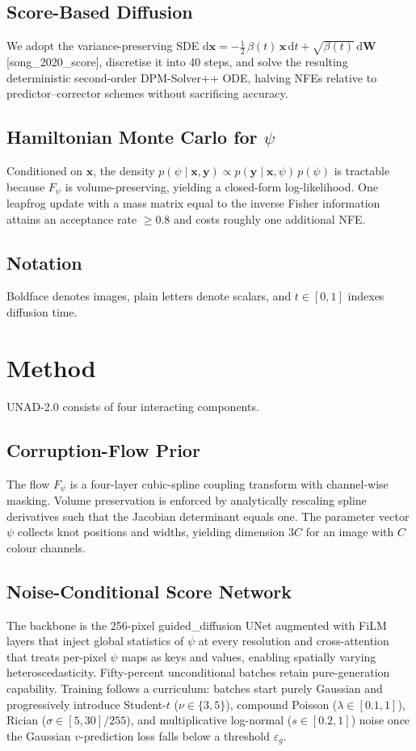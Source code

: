\documentclass{article} %
\begin{document}
\subsection{Score-Based Diffusion}
We adopt the variance-preserving SDE \(\mathrm{d}\mathbf{x}=-\tfrac{1}{2}\,\beta(t)\,\mathbf{x}\,\mathrm{d}t+\sqrt{\beta(t)}\,\mathrm{d}\mathbf{W}\) [song_2020_score], discretise it into 40 steps, and solve the resulting deterministic second-order DPM-Solver++ ODE, halving NFEs relative to predictor–corrector schemes without sacrificing accuracy.

\subsection{Hamiltonian Monte Carlo for \(\psi\)}
Conditioned on \(\mathbf{x}\), the density \(p(\psi\mid\mathbf{x},\mathbf{y})\propto p(\mathbf{y}\mid\mathbf{x},\psi)\,p(\psi)\) is tractable because \(F_{\psi}\) is volume-preserving, yielding a closed-form log-likelihood. One leapfrog update with a mass matrix equal to the inverse Fisher information attains an acceptance rate \(\geq 0.8\) and costs roughly one additional NFE.

\subsection{Notation}
Boldface denotes images, plain letters denote scalars, and \(t\in[0,1]\) indexes diffusion time.

\section{Method}
\label{sec:method}
UNAD-2.0 consists of four interacting components.

\subsection{Corruption-Flow Prior}
The flow \(F_{\psi}\) is a four-layer cubic-spline coupling transform with channel-wise masking. Volume preservation is enforced by analytically rescaling spline derivatives such that the Jacobian determinant equals one. The parameter vector \(\psi\) collects knot positions and widths, yielding dimension \(3C\) for an image with \(C\) colour channels.

\subsection{Noise-Conditional Score Network}
The backbone is the 256-pixel guided\_diffusion UNet augmented with FiLM layers that inject global statistics of \(\psi\) at every resolution and cross-attention that treats per-pixel \(\psi\) maps as keys and values, enabling spatially varying heteroscedasticity. Fifty-percent unconditional batches retain pure-generation capability. Training follows a curriculum: batches start purely Gaussian and progressively introduce Student-\(t\) (\(\nu\in\{3,5\}\)), compound Poisson (\(\lambda\in[0.1,1]\)), Rician (\(\sigma\in[5,30]/255\)), and multiplicative log-normal (\(s\in[0.2,1]\)) noise once the Gaussian \(v\)-prediction loss falls below a threshold \(\varepsilon_{g}\).
\end{document}
